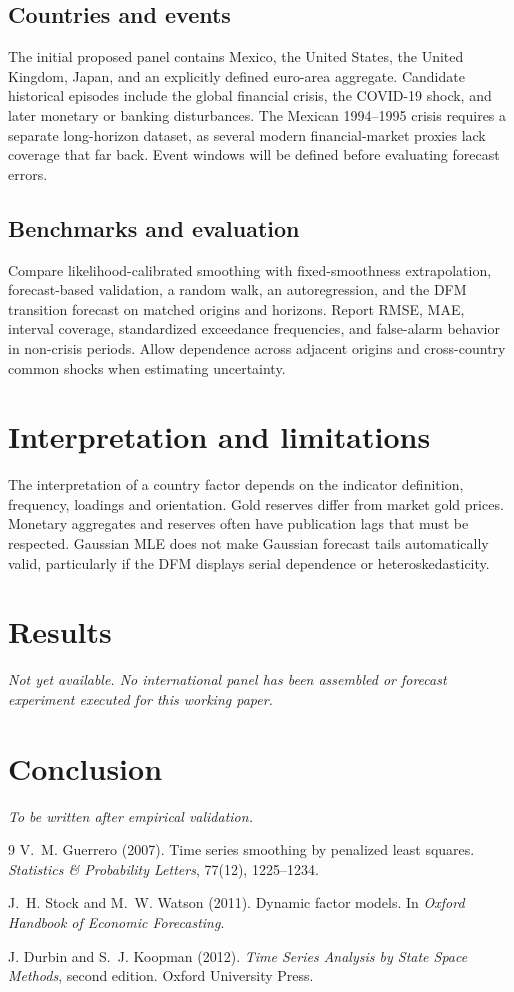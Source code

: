 \documentclass[11pt]{article}
\begin{document}
\subsection{Countries and events}
The initial proposed panel contains Mexico, the United States,
the United Kingdom, Japan, and an explicitly defined euro-area aggregate.
Candidate historical episodes include the global financial crisis,
the COVID-19 shock, and later monetary or banking disturbances.
The Mexican 1994--1995 crisis requires a separate long-horizon dataset,
as several modern financial-market proxies lack coverage that far back.
Event windows will be defined before evaluating forecast errors.

\subsection{Benchmarks and evaluation}
Compare likelihood-calibrated smoothing with fixed-smoothness
extrapolation, forecast-based validation, a random walk, an autoregression,
and the DFM transition forecast on matched origins and horizons.
Report RMSE, MAE, interval coverage, standardized exceedance frequencies,
and false-alarm behavior in non-crisis periods.
Allow dependence across adjacent origins and cross-country common shocks
when estimating uncertainty.

\section{Interpretation and limitations}
The interpretation of a country factor depends on the indicator
definition, frequency, loadings and orientation. Gold reserves differ
from market gold prices. Monetary aggregates and reserves often have
publication lags that must be respected. Gaussian MLE does not make
Gaussian forecast tails automatically valid, particularly if the DFM
displays serial dependence or heteroskedasticity.

\section{Results}
\emph{Not yet available. No international panel has been assembled or
forecast experiment executed for this working paper.}

\section{Conclusion}
\emph{To be written after empirical validation.}

\begin{thebibliography}{9}
V.~M. Guerrero (2007).
Time series smoothing by penalized least squares.
\emph{Statistics \& Probability Letters}, 77(12), 1225--1234.

J.~H. Stock and M.~W. Watson (2011).
Dynamic factor models.
In \emph{Oxford Handbook of Economic Forecasting}.

J. Durbin and S.~J. Koopman (2012).
\emph{Time Series Analysis by State Space Methods},
second edition. Oxford University Press.
\end{thebibliography}
\end{document}
